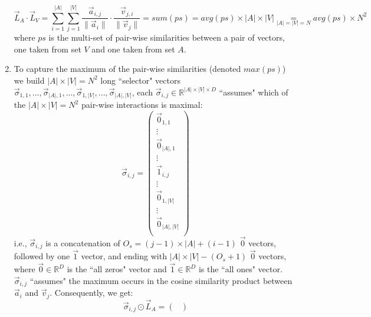 \begin{enumerate}
    \begin{equation*}
        \vec{L}_{A} \cdot \vec{L}_V = \sum_{i = 1}^{|A|}{\sum_{j = 1}^{|V|} \frac{\vec{a}_{i, j}}{\lVert \vec{a}_i \rVert} \cdot \frac{\vec{v}_{j, i}}{\lVert \vec{v}_j \rVert}} = sum(ps) = avg(ps) \times |A| \times |V| \underset{\scriptscriptstyle |A| = |V| = N}{=} avg(ps) \times N^2
    \end{equation*}
    where $ps$ is the multi-set of pair-wise similarities between a pair of vectors, one taken from set $V$ and one taken from set $A$.
    \item To capture the maximum of the pair-wise similarities (denoted $max(ps)$) we build $|A| \times |V| = N^2$ long ``selector" vectors $\vec{\sigma}_{1, 1}, ..., \vec{\sigma}_{|A|, 1}, ..., \vec{\sigma}_{1, |V|}, ..., \vec{\sigma}_{|A|, |V|}$, each $\vec{\sigma}_{i, j} \in \mathbb{R}^{|A| \times |V| \times D}$ ``assumes" which of the $|A| \times |V| = N^2$ pair-wise interactions is maximal:\\
    \begin{equation*}
        \vec{\sigma}_{i, j} = \begin{pmatrix}
                    \vec{0}_{1, 1}\\ 
                    \vdots\\ 
                    \vec{0}_{|A|, 1}\\ 
                   \vdots\\
                   \vec{1}_{i, j}\\ 
                   \vdots\\
                   \vec{0}_{1, |V|}\\ 
                   \vdots\\ 
                   \vec{0}_{|A|, |V|}\\ 
                   \end{pmatrix}
    \end{equation*}
    i.e., $\vec{\sigma}_{i, j}$ is a concatenation of $O_s = (j - 1) \times |A| + (i - 1)$ $\vec{0}$ vectors, followed by one $\vec{1}$ vector, and ending with $|A| \times |V| - (O_s + 1)$ $\vec{0}$ vectors,
    where $\vec{0} \in \mathbb{R}^D$ is the ``all zeros" vector and $\vec{1} \in \mathbb{R}^D$ is the ``all ones" vector. 
    $\vec{\sigma}_{i, j}$ ``assumes" the maximum occurs in the cosine similarity product between $\vec{a}_i$ and $\vec{v}_j$.
    Consequently, we get:\\
    \begin{equation*}
        \vec{\sigma}_{i, j} \odot \vec{L}_{A} = \begin{pmatrix}

\end{pmatrix}
\end{equation*}
\end{enumerate}
